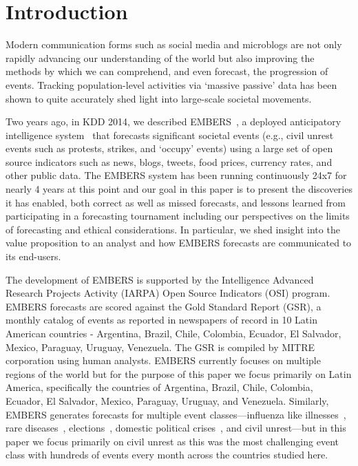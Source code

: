 \section{Introduction}
Modern communication forms such as social media and microblogs are not only rapidly
advancing our understanding of the world but also improving the methods by which we can
comprehend, and even forecast, the progression of events.
Tracking population-level activities via `massive passive' data has been shown to
quite accurately shed light into large-scale societal movements.

Two years ago, in KDD 2014, we described EMBERS~\cite{kdd:beating-the-news}, a deployed anticipatory
intelligence system~\cite{bigdata-andy-doyle-embers-paper} that forecasts significant
societal events (e.g., civil unrest
events such as protests, strikes, and `occupy' events) using a large set of open source
indicators such as news, blogs, tweets, food prices, currency rates, and other public
data. The EMBERS system has been running continuously 24x7 for nearly 4 years at this point
and our goal in this paper is to present the discoveries it has enabled,
both correct as well as missed
forecasts, and lessons learned from participating in a forecasting tournament including
our perspectives on the limits of forecasting and ethical considerations. In
particular, we shed insight into the value proposition to an analyst and how EMBERS forecasts
are communicated to its end-users.

The development of EMBERS is supported by the Intelligence Advanced Research Projects
Activity (IARPA) Open Source Indicators (OSI) program.
EMBERS forecasts are scored against the Gold Standard Report (GSR), a monthly catalog of
events as reported in newspapers of record in 10 Latin American
countries - Argentina, Brazil, Chile, Colombia, Ecuador, El Salvador,
Mexico, Paraguay, Uruguay, Venezuela. The GSR is compiled by MITRE corporation
using human analysts.
EMBERS currently focuses on multiple regions of the world but for the purpose of this paper
we focus primarily on Latin America, specifically the countries of
Argentina, Brazil, Chile, Colombia, Ecuador, El Salvador, Mexico, Paraguay, Uruguay, and Venezuela.
Similarly, EMBERS generates forecasts for multiple event classes---influenza like illnesses~\cite{prithwish-ili},
rare diseases~\cite{sdm-saurav}, elections~\cite{aravindan-wei-besc}, domestic political crises~\cite{gdelt-acm-webscience}, and civil unrest---but in this paper we focus primarily on civil unrest as this was the
most challenging event class with hundreds of events every month across the countries studied here.

